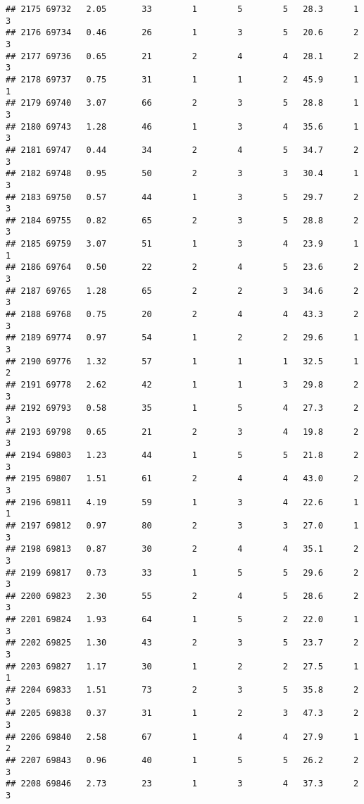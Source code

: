 \documentclass[
]{article}
\begin{document}
\begin{verbatim}
## 2175 69732   2.05       33        1        5        5   28.3      1      3
## 2176 69734   0.46       26        1        3        5   20.6      2      3
## 2177 69736   0.65       21        2        4        4   28.1      2      3
## 2178 69737   0.75       31        1        1        2   45.9      1      1
## 2179 69740   3.07       66        2        3        5   28.8      1      3
## 2180 69743   1.28       46        1        3        4   35.6      1      3
## 2181 69747   0.44       34        2        4        5   34.7      2      3
## 2182 69748   0.95       50        2        3        3   30.4      1      3
## 2183 69750   0.57       44        1        3        5   29.7      2      3
## 2184 69755   0.82       65        2        3        5   28.8      2      3
## 2185 69759   3.07       51        1        3        4   23.9      1      1
## 2186 69764   0.50       22        2        4        5   23.6      2      3
## 2187 69765   1.28       65        2        2        3   34.6      2      3
## 2188 69768   0.75       20        2        4        4   43.3      2      3
## 2189 69774   0.97       54        1        2        2   29.6      1      3
## 2190 69776   1.32       57        1        1        1   32.5      1      2
## 2191 69778   2.62       42        1        1        3   29.8      2      3
## 2192 69793   0.58       35        1        5        4   27.3      2      3
## 2193 69798   0.65       21        2        3        4   19.8      2      3
## 2194 69803   1.23       44        1        5        5   21.8      2      3
## 2195 69807   1.51       61        2        4        4   43.0      2      3
## 2196 69811   4.19       59        1        3        4   22.6      1      1
## 2197 69812   0.97       80        2        3        3   27.0      1      3
## 2198 69813   0.87       30        2        4        4   35.1      2      3
## 2199 69817   0.73       33        1        5        5   29.6      2      3
## 2200 69823   2.30       55        2        4        5   28.6      2      3
## 2201 69824   1.93       64        1        5        2   22.0      1      3
## 2202 69825   1.30       43        2        3        5   23.7      2      3
## 2203 69827   1.17       30        1        2        2   27.5      1      1
## 2204 69833   1.51       73        2        3        5   35.8      2      3
## 2205 69838   0.37       31        1        2        3   47.3      2      3
## 2206 69840   2.58       67        1        4        4   27.9      1      2
## 2207 69843   0.96       40        1        5        5   26.2      2      3
## 2208 69846   2.73       23        1        3        4   37.3      2      3

\end{verbatim}
\end{document}
